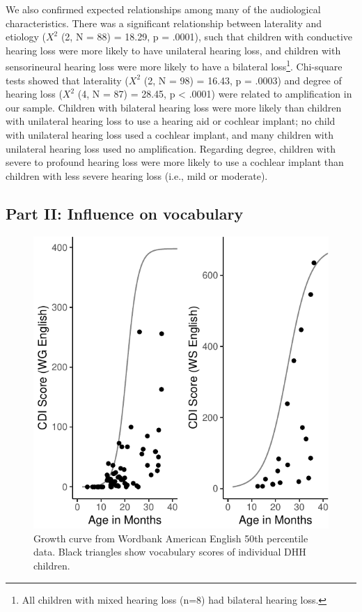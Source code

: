 \documentclass[
  english,
  man]{apa6}
\begin{document}
We also confirmed expected relationships among many of the audiological characteristics. There was a significant relationship between laterality and etiology (\(X^2\) (2, N = 88) = 18.29, p = .0001), such that children with conductive hearing loss were more likely to have unilateral hearing loss, and children with sensorineural hearing loss were more likely to have a bilateral loss\footnote{All children with mixed hearing loss (n=8) had bilateral hearing loss.}. Chi-square tests showed that laterality (\(X^2\) (2, N = 98) = 16.43, p = .0003) and degree of hearing loss (\(X^2\) (4, N = 87) = 28.45, p \textless{} .0001) were related to amplification in our sample. Children with bilateral hearing loss were more likely than children with unilateral hearing loss to use a hearing aid or cochlear implant; no child with unilateral hearing loss used a cochlear implant, and many children with unilateral hearing loss used no amplification. Regarding degree, children with severe to profound hearing loss were more likely to use a cochlear implant than children with less severe hearing loss (i.e., mild or moderate).

\hypertarget{part-ii-influence-on-vocabulary}{%
\subsection{Part II: Influence on vocabulary}\label{part-ii-influence-on-vocabulary}}

\begin{figure}
\centering
\includegraphics{ELSSP_paper_files/figure-latex/english-curves-1.pdf}
\caption{\label{fig:english-curves}Growth curve from Wordbank American English 50th percentile data. Black triangles show vocabulary scores of individual DHH children.}
\end{figure}
\end{document}

